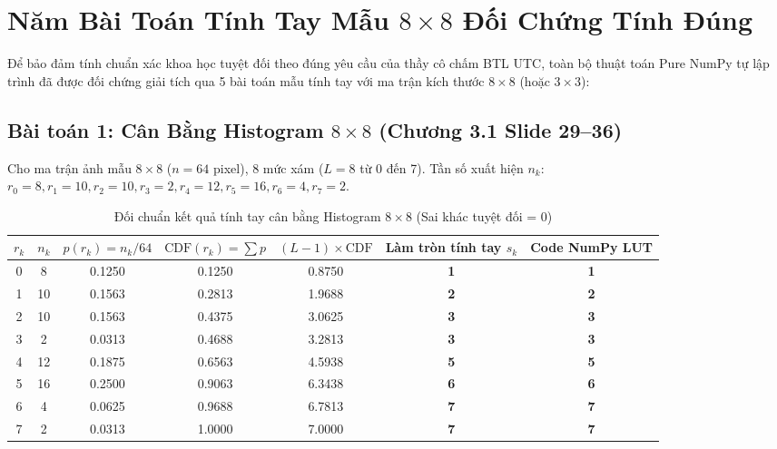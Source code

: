 \documentclass[11pt,a4paper]{article}
\begin{document}
\section{Năm Bài Toán Tính Tay Mẫu $8 \times 8$ Đối Chứng Tính Đúng}

Để bảo đảm tính chuẩn xác khoa học tuyệt đối theo đúng yêu cầu của thầy cô chấm BTL UTC, toàn bộ thuật toán Pure NumPy tự lập trình đã được đối chứng giải tích qua 5 bài toán mẫu tính tay với ma trận kích thước $8 \times 8$ (hoặc $3 \times 3$):

\subsection{Bài toán 1: Cân Bằng Histogram $8 \times 8$ (Chương 3.1 Slide 29--36)}
Cho ma trận ảnh mẫu $8 \times 8$ ($n = 64$ pixel), 8 mức xám ($L=8$ từ 0 đến 7).
Tần số xuất hiện $n_k$: $r_0=8, r_1=10, r_2=10, r_3=2, r_4=12, r_5=16, r_6=4, r_7=2$.
\begin{table}[H]
\centering
\small
\begin{tabular}{|c|c|c|c|c|c|c|}
\hline
$r_k$ & $n_k$ & $p(r_k) = n_k/64$ & $\text{CDF}(r_k) = \sum p$ & $(L-1) \times \text{CDF}$ & Làm tròn tính tay $s_k$ & Code NumPy LUT \\
\hline
0 & 8 & 0.1250 & 0.1250 & 0.8750 & \textbf{1} & \textbf{1} \\
1 & 10 & 0.1563 & 0.2813 & 1.9688 & \textbf{2} & \textbf{2} \\
2 & 10 & 0.1563 & 0.4375 & 3.0625 & \textbf{3} & \textbf{3} \\
3 & 2 & 0.0313 & 0.4688 & 3.2813 & \textbf{3} & \textbf{3} \\
4 & 12 & 0.1875 & 0.6563 & 4.5938 & \textbf{5} & \textbf{5} \\
5 & 16 & 0.2500 & 0.9063 & 6.3438 & \textbf{6} & \textbf{6} \\
6 & 4 & 0.0625 & 0.9688 & 6.7813 & \textbf{7} & \textbf{7} \\
7 & 2 & 0.0313 & 1.0000 & 7.0000 & \textbf{7} & \textbf{7} \\
\hline
\end{tabular}
\caption{Đối chuẩn kết quả tính tay cân bằng Histogram $8 \times 8$ (Sai khác tuyệt đối = 0)}
\end{table}
\end{document}
